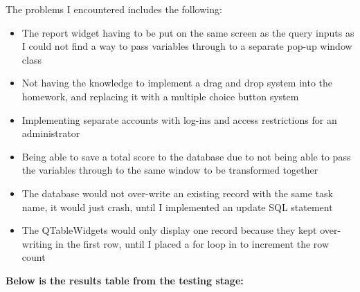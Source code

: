 The problems I encountered includes the following:

\begin{itemize}
	\item The report widget having to be put on the same screen as the query inputs as I could not find a way to pass variables through to a separate pop-up window class
	\item Not having the knowledge to implement a drag and drop system into the homework, and replacing it with a multiple choice button system
	\item Implementing separate accounts with log-ins and access restrictions for an administrator
	\item Being able to save a total score to the database due to not being able to pass the variables through to the same window to be transformed together
	\item The database would not over-write an existing record with the same task name, it would just crash, until I implemented an update SQL statement
	\item The QTableWidgets would only display one record because they kept over-writing in the first row, until I placed a for loop in to increment the row count
\end{itemize}

\textbf{Below is the results table from the testing stage: }

